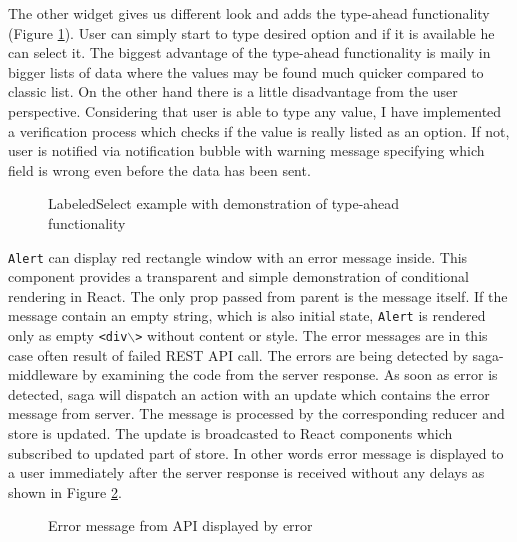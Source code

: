 The other widget gives us different look and adds the type-ahead functionality (Figure \ref{labelledSelect}). User can simply start to type desired option and if it is available he can select it. The biggest advantage of the type-ahead functionality is maily in bigger lists of data where the values may be found much quicker compared to classic list. On the other hand there is a little disadvantage from the user perspective. Considering that user is able to type any value, I have implemented a verification process which checks if the value is really listed as an option. If not, user is notified via notification bubble with warning message specifying which field is wrong even before the data has been sent.

\begin{figure}[h]
\caption{LabeledSelect example with demonstration of type-ahead functionality}
\label{labelledSelect}
\end{figure} 

\texttt{Alert} can display red rectangle window with an error message inside. This component provides a transparent and simple demonstration of conditional rendering in React. The only prop passed from parent is the message itself. If the message contain an empty string, which is also initial state, \texttt{Alert} is rendered only as empty \texttt{<div$\backslash$>} without content or style. 
The error messages are in this case often result of failed REST API call. The errors are being detected by saga-middleware by examining the code from the server response. As soon as error is detected, saga will dispatch an action with an update which contains the error message from server. The message is processed by the corresponding reducer and store is updated. The update is broadcasted to React components which subscribed to updated part of store. In other words error message is displayed to a user immediately after the server response is received without any delays as shown in Figure \ref{alert}.

\begin{figure}[h]
\caption{Error message from API displayed by error}
\label{alert}
\end{figure}


